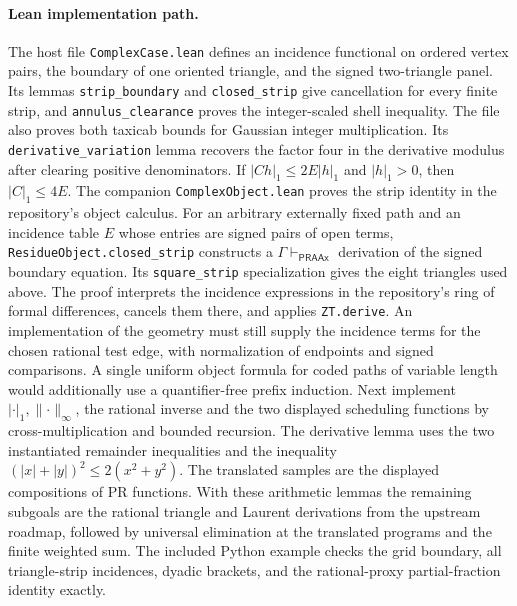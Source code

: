 \paragraph{Lean implementation path.}
The host file \texttt{ComplexCase.lean} defines an incidence functional
on ordered vertex pairs, the boundary of one oriented triangle, and
the signed two-triangle panel. Its lemmas \texttt{strip\_boundary}
and \texttt{closed\_strip} give cancellation for every finite strip,
and \texttt{annulus\_clearance} proves the integer-scaled shell
inequality. The file also proves both taxicab bounds for Gaussian integer
multiplication. Its \texttt{derivative\_variation} lemma recovers the
factor four in the derivative modulus after clearing positive denominators. If $|Ch|_1\le 2E|h|_1$ and $|h|_1>0$, then $|C|_1\le4E$. The companion \texttt{ComplexObject.lean} proves the strip identity in
the repository's object calculus. For an arbitrary externally fixed
path and an incidence table $E$ whose entries are signed pairs of open
terms, \texttt{ResidueObject.closed\_strip} constructs a
$\Gamma\vdash_{\mathsf{PRAAx}}$ derivation of the signed boundary
equation. Its \texttt{square\_strip} specialization gives the eight
triangles used above. The proof interprets the incidence expressions
in the repository's ring of formal differences, cancels them there, and
applies \texttt{ZT.derive}. An implementation of the geometry must still
supply the incidence terms for the chosen rational test edge, with
normalization of endpoints and signed comparisons. A single uniform
object formula for coded paths of variable length would additionally
use a quantifier-free prefix induction. Next implement
$|\cdot|_1,\lVert\cdot\rVert_\infty$,
the rational inverse and the two displayed scheduling functions by
cross-multiplication and bounded recursion. The derivative lemma uses
the two instantiated remainder inequalities and the inequality
$(|x|+|y|)^2\le2(x^2+y^2)$.
The translated samples are the displayed compositions of PR functions.
With these arithmetic lemmas the remaining subgoals are the
rational triangle and Laurent derivations from the upstream roadmap,
followed by universal elimination at the translated programs and
the finite weighted sum. The included Python example checks the grid
boundary, all triangle-strip incidences, dyadic brackets, and the
rational-proxy partial-fraction identity exactly.
